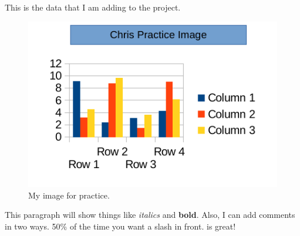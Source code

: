 This is the data that 
I am adding to the project.

\begin{figure}[h]
  \centering
  \includegraphics[scale=0.64]{figs/practiceimage}
  \caption{My image for practice. }
  \label{fig:practiceimage}
\end{figure}

This paragraph will show things like
{\em italics} and {\bf bold}.  Also,
I can add comments in two ways.
50\% of the time you want a slash
in front.  
 is great!

